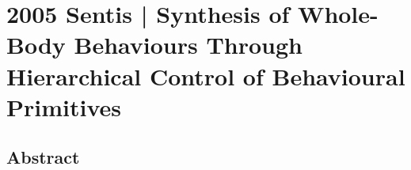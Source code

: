 \section{2005 Sentis | Synthesis of Whole-Body Behaviours Through Hierarchical Control of Behavioural Primitives}

\cite{sentis2005} 

\subsection{Abstract}
